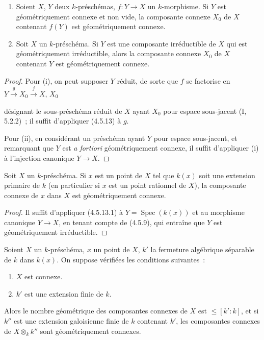 \begin{corollary}[4.5.13.1]
\label{IV.2.4.5.13.1-fr}
\begin{enumerate}
\item[(i)] Soient $X$, $Y$ deux $k$-préschémas, $f:Y\to X$ un $k$-morphisme.
Si $Y$ est géométriquement connexe et non vide, la composante connexe $X_0$ de
$X$ contenant $f(Y)$ est géométriquement connexe.
\item[(ii)] Soit $X$ un $k$-préschéma. Si $Y$ est une composante irréductible
de $X$ qui est géométriquement irréductible, alors la composante connexe $X_0$
de $X$ contenant $Y$ est géométriquement connexe.
\end{enumerate}
\end{corollary}

\begin{proof}
Pour (i), on peut supposer $Y$ réduit, de sorte que $f$ se factorise en
$Y\xrightarrow{g}X_0\xrightarrow{j}X$, $X_0$


désignant le sous-préschéma réduit de $X$ ayant $X_0$ pour espace sous-jacent
(I, 5.2.2)~; il suffit d'appliquer (4.5.13) à $g$.

Pour (ii), en considérant un préschéma ayant $Y$ pour espace sous-jacent, et
remarquant que $Y$ est \emph{a fortiori} géométriquement connexe, il suffit
d'appliquer (i) à l'injection canonique $Y\to X$.
\end{proof}

\begin{corollary}[4.5.14]
\label{IV.2.4.5.14-fr}
Soit $X$ un $k$-préschéma. Si $x$ est un point de $X$ tel que $k(x)$ soit une
extension primaire de $k$ (en particulier si $x$ est un point rationnel de
$X$), la composante connexe de $x$ dans $X$ est géométriquement connexe.
\end{corollary}

\begin{proof}
Il suffit d'appliquer (4.5.13.1) à $Y=\operatorname{Spec}(k(x))$ et au
morphisme canonique $Y\to X$, en tenant compte de (4.5.9), qui entraîne que
$Y$ est géométriquement irréductible.
\end{proof}

\begin{proposition}[4.5.15]
\label{IV.2.4.5.15-fr}
Soient $X$ un $k$-préschéma, $x$ un point de $X$, $k'$ la fermeture algébrique
séparable de $k$ dans $k(x)$. On suppose vérifiées les conditions suivantes~:
\begin{enumerate}
\item[(i)] $X$ est connexe.
\item[(ii)] $k'$ est une extension finie de $k$.
\end{enumerate}
Alors le nombre géométrique des composantes connexes de $X$ est
$\leqslant[k':k]$, et si $k''$ est une extension galoisienne finie de $k$
contenant $k'$, les composantes connexes de $X\otimes_k k''$ sont
géométriquement connexes.
\end{proposition}

